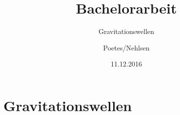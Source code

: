 \documentclass[openany]{scrbook}
\title{Bachelorarbeit}
\subtitle{Gravitationswellen}
\author{Poetes/Nehlsen}
\date{11.12.2016}
\begin{document}
	
	\maketitle
	\tableofcontents

	\chapter
	{Gravitationswellen}
\end{document}
